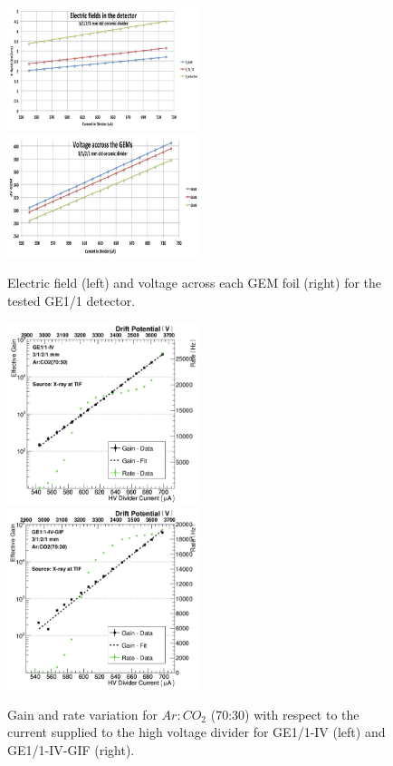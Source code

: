 \begin{figure}[htbp]
    \centering
    \includegraphics[width=0.5\textwidth]{figures/GEM/GE11_IV_ElectricField_detector.jpeg}%
    \includegraphics[width=0.5\textwidth]{figures/GEM/GE11_IV_VoltageAcross_GEM.jpeg}
    \caption{Electric field (left) and voltage across each GEM foil (right) for the tested GE1/1 detector.}
    \label{fig:GEM_voltage_electricfield}
\end{figure}
\begin{figure}[htbp]
    \centering
    \includegraphics[width=0.5\textwidth]{figures/GEM/Gain_curve_GE11_IV_Ar_CO2.jpeg}%
    \includegraphics[width=0.5\textwidth]{figures/GEM/Gain_curve_GE11_IV_GIF_Ar_CO2.jpeg}
    \caption{Gain and rate variation for $Ar:CO_2$ (70:30) with respect to the current supplied to the high voltage divider for GE1/1-IV (left) and GE1/1-IV-GIF (right).}
    \label{fig:gain_GE1/1_IV}
\end{figure}
